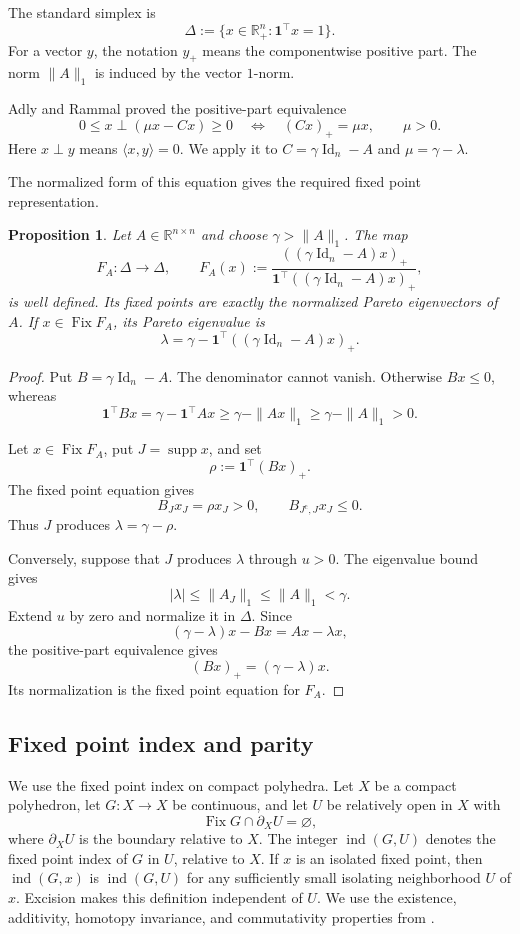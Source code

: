 \documentclass[11pt,a4paper]{article}
\newtheorem{proposition}[theorem]{Proposition}
\theoremstyle{definition}
\newcommand{\R}{\mathbb R}
\newcommand{\Id}{\operatorname{Id}}
\newcommand{\one}{\mathbf 1}
\newcommand{\supp}{\operatorname{supp}}
\newcommand{\Fix}{\operatorname{Fix}}
\newcommand{\ind}{\operatorname{ind}}
\begin{document}
The standard simplex is
$$
\Delta:=\{x\in\R_+^n:\one^\top x=1\}.
$$
For a vector $y$, the notation $y_+$ means the componentwise positive
part. The norm $\|A\|_1$ is induced by the vector $1$-norm.

Adly and Rammal proved the positive-part equivalence
\cite[Lemma~3 and Remark~3]{AdlyRammal2013}
$$
0\leq x\perp(\mu x-Cx)\geq0
\quad\Longleftrightarrow\quad
(Cx)_+=\mu x,
\qquad
\mu>0.
$$
Here $x\perp y$ means $\langle x,y\rangle=0$.
We apply it to $C=\gamma\Id_n-A$ and $\mu=\gamma-\lambda$.

The normalized form of this equation gives the required fixed point
representation.

\begin{proposition}
\label{prop:fixed-point-representation}
Let $A\in\R^{n\times n}$ and choose $\gamma>\|A\|_1$. The map
$$
F_A:\Delta\longrightarrow\Delta,
\qquad
F_A(x):=
\frac{((\gamma\Id_n-A)x)_+}
{\one^\top((\gamma\Id_n-A)x)_+},
$$
is well defined. Its fixed points are exactly the normalized Pareto
eigenvectors of $A$. If $x\in\Fix F_A$, its Pareto eigenvalue is
$$
\lambda
=
\gamma-\one^\top((\gamma\Id_n-A)x)_+.
$$
\end{proposition}

\begin{proof}
Put $B=\gamma\Id_n-A$. The denominator cannot vanish. Otherwise
$Bx\leq0$, whereas
$$
\one^\top Bx
=
\gamma-\one^\top Ax
\geq
\gamma-\|Ax\|_1
\geq
\gamma-\|A\|_1
>0.
$$

Let $x\in\Fix F_A$, put $J=\supp x$, and set
$$
\rho:=\one^\top(Bx)_+.
$$
The fixed point equation gives
$$
B_Jx_J=\rho x_J>0,
\qquad
B_{J^{\mathrm c},J}x_J\leq0.
$$
Thus $J$ produces $\lambda=\gamma-\rho$.

Conversely, suppose that $J$ produces $\lambda$ through $u>0$. The
eigenvalue bound gives
$$
|\lambda|
\leq
\|A_J\|_1
\leq
\|A\|_1
<\gamma.
$$
Extend $u$ by zero and normalize it in $\Delta$. Since
$$
(\gamma-\lambda)x-Bx=Ax-\lambda x,
$$
the positive-part equivalence gives
$$
(Bx)_+=(\gamma-\lambda)x.
$$
Its normalization is the fixed point equation for $F_A$.
\end{proof}

\subsection{Fixed point index and parity}

We use the fixed point index on compact polyhedra. Let $X$ be a compact
polyhedron, let $G:X\to X$ be continuous, and let $U$ be relatively
open in $X$ with
$$
\Fix G\cap\partial_XU=\varnothing,
$$
where $\partial_XU$ is the boundary relative to $X$. The integer
$\ind(G,U)$ denotes the fixed point index of $G$ in $U$, relative to
$X$. If $x$ is an isolated fixed point, then $\ind(G,x)$ is
$\ind(G,U)$ for any sufficiently small isolating neighborhood $U$ of
$x$. Excision makes this definition independent of $U$. We use the
existence, additivity, homotopy invariance, and commutativity properties
from \cite[Section~12, pp.~305-326]{GranasDugundji2003}.
\end{document}
